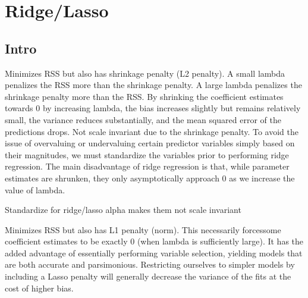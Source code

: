 \documentclass[]{book}
\newenvironment{Shaded}{\begin{snugshade}}{\end{snugshade}}
\newcommand{\KeywordTok}[1]{\textcolor[rgb]{0.13,0.29,0.53}{\textbf{#1}}}
\newcommand{\DataTypeTok}[1]{\textcolor[rgb]{0.13,0.29,0.53}{#1}}
\newcommand{\StringTok}[1]{\textcolor[rgb]{0.31,0.60,0.02}{#1}}
\newcommand{\OperatorTok}[1]{\textcolor[rgb]{0.81,0.36,0.00}{\textbf{#1}}}
\newcommand{\NormalTok}[1]{#1}
\begin{document}
\begin{Shaded}
\end{Shaded}

\section{Ridge/Lasso}\label{ridgelasso}

\subsection{Intro}\label{intro}

Minimizes RSS but also has shrinkage penalty (L2 penalty). A small
lambda penalizes the RSS more than the shrinkage penalty. A large lambda
penalizes the shrinkage penalty more than the RSS. By shrinking the
coefficient estimates towards 0 by increasing lambda, the bias increases
slightly but remains relatively small, the variance reduces
substantially, and the mean squared error of the predictions drops. Not
scale invariant due to the shrinkage penalty. To avoid the issue of
overvaluing or undervaluing certain predictor variables simply based on
their magnitudes, we must standardize the variables prior to performing
ridge regression. The main disadvantage of ridge regression is that,
while parameter estimates are shrunken, they only asymptotically
approach 0 as we increase the value of lambda.

Standardize for ridge/lasso alpha makes them not scale invariant

Minimizes RSS but also has L1 penalty (norm). This necessarily
forcessome coefficient estimates to be exactly 0 (when lambda is
sufficiently large). It has the added advantage of essentially
performing variable selection, yielding models that are both accurate
and parsimonious. Restricting ourselves to simpler models by including a
Lasso penalty will generally decrease the variance of the fits at the
cost of higher bias.
\end{document}

